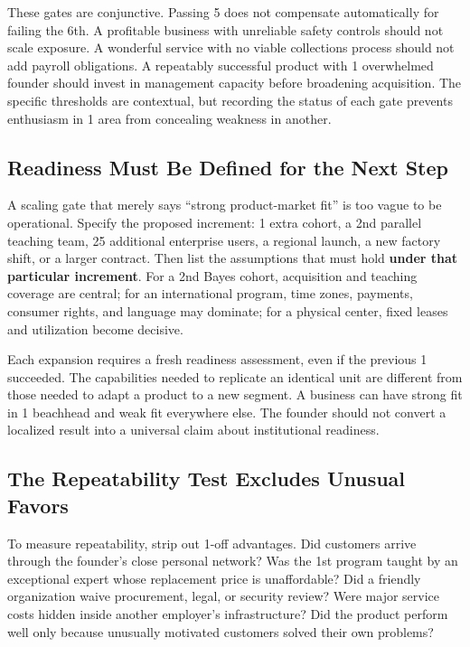 These gates are conjunctive. Passing 5 does not compensate automatically for failing the 6th. A profitable business with unreliable safety controls should not scale exposure. A wonderful service with no viable collections process should not add payroll obligations. A repeatably successful product with 1 overwhelmed founder should invest in management capacity before broadening acquisition. The specific thresholds are contextual, but recording the status of each gate prevents enthusiasm in 1 area from concealing weakness in another.

\subsection{Readiness Must Be Defined for the Next Step}
\label{sec:readiness_defined_next_step}

A scaling gate that merely says ``strong product-market fit'' is too vague to be operational. Specify the proposed increment: 1 extra cohort, a 2nd parallel teaching team, 25 additional enterprise users, a regional launch, a new factory shift, or a larger contract. Then list the assumptions that must hold \textbf{under that particular increment}. For a 2nd Bayes cohort, acquisition and teaching coverage are central; for an international program, time zones, payments, consumer rights, and language may dominate; for a physical center, fixed leases and utilization become decisive.

Each expansion requires a fresh readiness assessment, even if the previous 1 succeeded. The capabilities needed to replicate an identical unit are different from those needed to adapt a product to a new segment. A business can have strong fit in 1 beachhead and weak fit everywhere else. The founder should not convert a localized result into a universal claim about institutional readiness.

\subsection{The Repeatability Test Excludes Unusual Favors}
\label{sec:repeatability_test_excludes_favors}

To measure repeatability, strip out 1-off advantages. Did customers arrive through the founder's close personal network? Was the 1st program taught by an exceptional expert whose replacement price is unaffordable? Did a friendly organization waive procurement, legal, or security review? Were major service costs hidden inside another employer's infrastructure? Did the product perform well only because unusually motivated customers solved their own problems?


